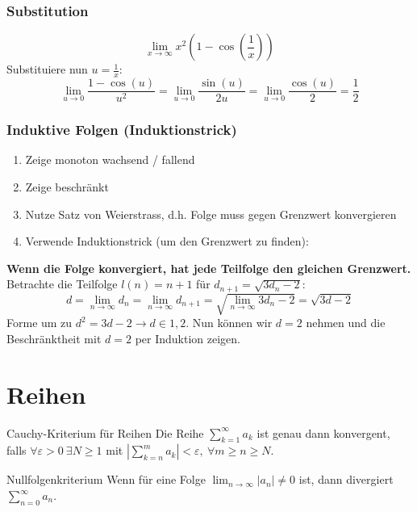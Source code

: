 \documentclass[a4paper,fontsize = 7pt]{scrartcl}
\def\limn{\lim_{n\to \infty}}
\def\sumk{\sum_{k=1}^\infty}
\def\sumn{\sum_{n=0}^\infty}
\begin{document}
\subsubsection{Substitution}
$$\lim_{x\to\infty} x^2 (1-\cos(\frac{1}{x}))$$
Substituiere nun $u = \frac{1}{x}$:
$$\lim_{u \to 0} \frac{1 - \cos(u)}{u^2} = \lim_{u \to 0} \frac{\sin(u)}{2u} = \lim_{u\to 0} \frac{\cos(u)}{2} = \frac{1}{2}$$

\subsubsection{Induktive Folgen (Induktionstrick)}
\begin{enumerate}
  \item Zeige monoton wachsend / fallend
  \item Zeige beschränkt
  \item Nutze Satz von Weierstrass, d.h. Folge muss gegen Grenzwert konvergieren
  \item Verwende Induktionstrick (um den Grenzwert zu finden):
\end{enumerate}
\textbf{Wenn die Folge konvergiert, hat jede Teilfolge den gleichen Grenzwert.} Betrachte die Teilfolge $l(n) = n + 1$ für $d_{n+1} = \sqrt{3d_n - 2}$:
$$d = \lim_{n\to\infty} d_n = \lim_{n\to\infty} d_{n+1} = \sqrt{\lim_{n \to \infty} 3d_n -2} = \sqrt{3d -2}$$
Forme um zu $ d^2 = 3d -2 \to d \in {1,2}$. Nun können wir $d = 2$ nehmen und die Beschränktheit mit $d=2$ per Induktion zeigen.

\section{Reihen}

\begin{mainbox}{Cauchy-Kriterium für Reihen}
  \vspace{-4pt}
Die Reihe $\sumk a_k$ ist genau dann konvergent, falls $\forall \varepsilon > 0 \ \exists N \ge 1$ mit $| \sum_{k=n}^m a_k | < \varepsilon, \ \forall m \ge n \ge N$.
  \vspace{-4pt}
\end{mainbox}

\begin{subbox}{Nullfolgenkriterium}
  \vspace{-4pt}
 Wenn für eine Folge $\limn |a_n| \ne 0$ ist, dann divergiert $\sumn a_n$.
 \vspace{-4pt}
\end{subbox}
\end{document}
